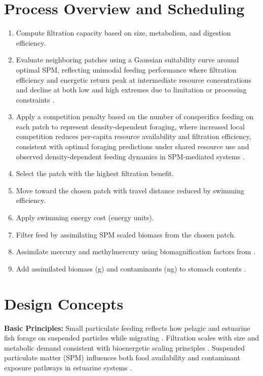 \documentclass[
]{book}
\providecommand{\tightlist}{%
  \setlength{\itemsep}{0pt}\setlength{\parskip}{0pt}}
\begin{document}
\section{Process Overview and Scheduling}\label{process-overview-and-scheduling-5}

\begin{enumerate}
\def\labelenumi{\arabic{enumi}.}
\tightlist
\item
  Compute filtration capacity based on size, metabolism, and digestion
  efficiency.
\item
  Evaluate neighboring patches using a Gaussian suitability curve
  around optimal SPM, reflecting unimodal feeding performance where
  filtration efficiency and energetic return peak at intermediate
  resource concentrations and decline at both low and high extremes
  due to limitation or processing constraints \citep{hirzel_habitat_2008}.
\item
  Apply a competition penalty based on the number of conspecifics
  feeding on each patch to represent density-dependent foraging, where
  increased local competition reduces per-capita resource availability
  and filtration efficiency, consistent with optimal foraging
  predictions under shared resource use \citep{townsend_application_1985}
  and observed density-dependent feeding dynamics in SPM-mediated
  systems \citep{kjelland_integrated_2015}.
\item
  Select the patch with the highest filtration benefit.
\item
  Move toward the chosen patch with travel distance reduced by
  swimming efficiency.
\item
  Apply swimming energy cost (energy units).
\item
  Filter feed by assimilating SPM scaled biomass from the chosen
  patch.
\item
  Assimilate mercury and methylmercury using biomagnification factors
  from \citep{lavoie_biomagnification_2013}.
\item
  Add assimilated biomass (g) and contaminants (ng) to stomach
  contents .
\end{enumerate}

\section{Design Concepts}\label{design-concepts-5}

\textbf{Basic Principles:} Small particulate feeding reflects how pelagic and
estuarine fish forage on suspended particles while migrating
\citep{janssen_feeding_1980}. Filtration scales with size and metabolic
demand consistent with bioenergetic scaling principles
\citep{norin_metabolic_2018}. Suspended particulate matter (SPM) influences
both food availability and contaminant exposure pathways in estuarine
systems \citep{kjelland_integrated_2015, kjelland_review_2015, lavoie_biomagnification_2013}.
\end{document}
